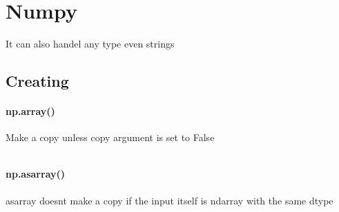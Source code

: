 \section{Numpy}
    It can also handel any type even strings
    \subsection{Creating}
    \paragraph{np.array()}
        Make a copy unless copy argument is set to False
        \begin{verbatim}
        \end{verbatim}
    \paragraph{np.asarray()}
        asarray doesnt make a copy if the input itself is ndarray with the same dtype


